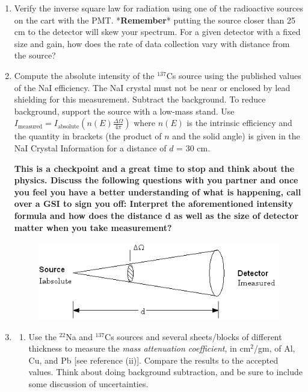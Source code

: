 \documentclass{../lab}
\begin{document}
\begin{enumerate}
\begin{enumerate}
    \end{enumerate}

    \item Verify the inverse square law for radiation using one of the radioactive sources on the cart with the PMT. *\textbf{Remember}* putting the source closer than 25 cm to the detector will skew your spectrum. For a given detector with a fixed size and gain, how does the rate of data collection vary with distance from the source?

    \item Compute the absolute intensity of the $^{137}$Cs source using the published values of the NaI efficiency. The NaI crystal must not be near or enclosed by lead shielding for this measurement. Subtract the background. To reduce background, support the source with a low-mass stand. Use $I_\textrm{measured} = I_\textrm{absolute} (n(E)\frac{\Delta\Omega}{4\pi})$ where $n(E)$ is the intrinsic efficiency and the quantity in brackets (the product of $n$ and the solid angle) is given in the NaI Crystal Information for a distance of $d$ = 30 cm.
    
    \textbf{This is a checkpoint and a great time to stop and think about the physics. Discuss the following questions with you partner and once you feel you have a better understanding of what is happening, call over a GSI to sign you off: Interpret the aforementioned intensity formula and how does the distance d as well as the size of detector matter when you take measurement?}

    \begin{figure}[h]
        \centering
        \href{http://experimentationlab.berkeley.edu/sites/default/files/images/GMAimage007.gif}{\includegraphics[width=0.8\linewidth]{images/GMAimage007.png}}
        \label{fig:GMAimage007}
    \end{figure}

    \item \begin{enumerate}
        \item Use the $^{22}$Na and $^{137}$Cs sources and several sheets/blocks of different thickness to measure the \emph{mass attenuation coefficient}, in cm$^2$/gm, of Al, Cu, and Pb [see reference (ii)]. Compare the results to the accepted values. Think about doing background subtraction, and be sure to include some discussion of uncertainties.


\end{enumerate}
\end{enumerate}
\end{document}
